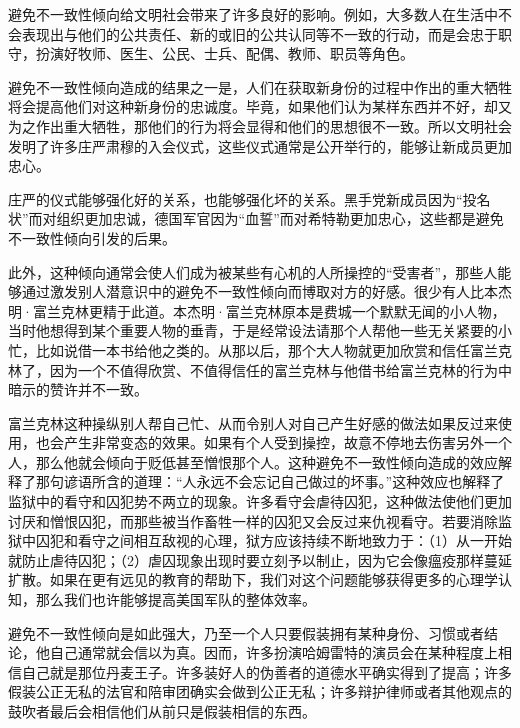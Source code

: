 避免不一致性倾向给文明社会带来了许多良好的影响。例如，大多数人在生活中不会表现出与他们的公共责任、新的或旧的公共认同等不一致的行动，而是会忠于职守，扮演好牧师、医生、公民、士兵、配偶、教师、职员等角色。
\par

避免不一致性倾向造成的结果之一是，人们在获取新身份的过程中作出的重大牺牲将会提高他们对这种新身份的忠诚度。毕竟，如果他们认为某样东西并不好，却又为之作出重大牺牲，那他们的行为将会显得和他们的思想很不一致。所以文明社会发明了许多庄严肃穆的入会仪式，这些仪式通常是公开举行的，能够让新成员更加忠心。
\par

庄严的仪式能够强化好的关系，也能够强化坏的关系。黑手党新成员因为“投名状”而对组织更加忠诚，德国军官因为“血誓”而对希特勒更加忠心，这些都是避免不一致性倾向引发的后果。
\par

此外，这种倾向通常会使人们成为被某些有心机的人所操控的“受害者”，那些人能够通过激发别人潜意识中的避免不一致性倾向而博取对方的好感。很少有人比本杰明·富兰克林更精于此道。本杰明·富兰克林原本是费城一个默默无闻的小人物，当时他想得到某个重要人物的垂青，于是经常设法请那个人帮他一些无关紧要的小忙，比如说借一本书给他之类的。从那以后，那个大人物就更加欣赏和信任富兰克林了，因为一个不值得欣赏、不值得信任的富兰克林与他借书给富兰克林的行为中暗示的赞许并不一致。
\par

富兰克林这种操纵别人帮自己忙、从而令别人对自己产生好感的做法如果反过来使用，也会产生非常变态的效果。如果有个人受到操控，故意不停地去伤害另外一个人，那么他就会倾向于贬低甚至憎恨那个人。这种避免不一致性倾向造成的效应解释了那句谚语所含的道理：“人永远不会忘记自己做过的坏事。”这种效应也解释了监狱中的看守和囚犯势不两立的现象。许多看守会虐待囚犯，这种做法使他们更加讨厌和憎恨囚犯，而那些被当作畜牲一样的囚犯又会反过来仇视看守。若要消除监狱中囚犯和看守之间相互敌视的心理，狱方应该持续不断地致力于：（1）从一开始就防止虐待囚犯；（2）虐囚现象出现时要立刻予以制止，因为它会像瘟疫那样蔓延扩散。如果在更有远见的教育的帮助下，我们对这个问题能够获得更多的心理学认知，那么我们也许能够提高美国军队的整体效率。
\par

避免不一致性倾向是如此强大，乃至一个人只要假装拥有某种身份、习惯或者结论，他自己通常就会信以为真。因而，许多扮演哈姆雷特的演员会在某种程度上相信自己就是那位丹麦王子。许多装好人的伪善者的道德水平确实得到了提高；许多假装公正无私的法官和陪审团确实会做到公正无私；许多辩护律师或者其他观点的鼓吹者最后会相信他们从前只是假装相信的东西。
\par

